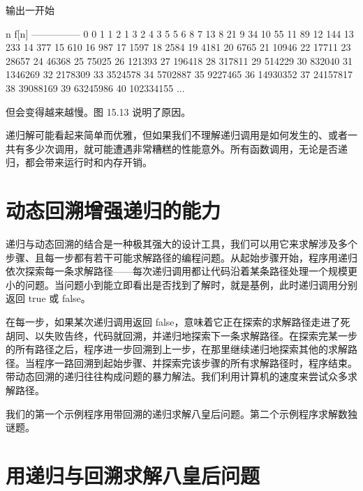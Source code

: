 输出一开始

\begin{codebox}
  n        f[n]
---------------
  0           0
  1           1
  2           1
  3           2
  4           3
  5           5
  6           8
  7          13
  8          21
  9          34
 10          55
 11          89
 12         144
 13         233
 14         377
 15         610
 16         987
 17        1597
 18        2584
 19        4181
 20        6765
 21       10946
 22       17711
 23       28657
 24       46368
 25       75025
 26      121393
 27      196418
 28      317811
 29      514229
 30      832040
 31     1346269
 32     2178309
 33     3524578
 34     5702887
 35     9227465
 36    14930352
 37    24157817
 38    39088169
 39    63245986
 40   102334155
...
\end{codebox}

但会变得越来越慢。图 15.13 说明了原因。


递归解可能看起来简单而优雅，但如果我们不理解递归调用是如何发生的、或者一共有多少次调用，就可能遭遇非常糟糕的性能意外。所有函数调用，无论是否递归，都会带来运行时和内存开销。

\section{动态回溯增强递归的能力}

递归与动态回溯的结合是一种极其强大的设计工具，我们可以用它来求解涉及多个步骤、且每一步都有若干可能求解路径的编程问题。从起始步骤开始，程序用递归依次探索每一条求解路径——每次递归调用都让代码沿着某条路径处理一个规模更小的问题。当问题小到能立即看出是否找到了解时，就是基例，此时递归调用分别返回 true 或 false。

在每一步，如果某次递归调用返回 false，意味着它正在探索的求解路径走进了死胡同、以失败告终，代码就回溯，并递归地探索下一条求解路径。在探索完某一步的所有路径之后，程序进一步回溯到上一步，在那里继续递归地探索其他的求解路径。当程序一路回溯到起始步骤、并探索完该步骤的所有求解路径时，程序结束。带动态回溯的递归往往构成问题的暴力解法。我们利用计算机的速度来尝试众多求解路径。

我们的第一个示例程序用带回溯的递归求解八皇后问题。第二个示例程序求解数独谜题。

\section{用递归与回溯求解八皇后问题}

